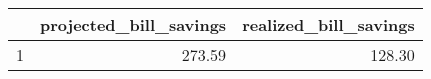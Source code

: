 \begin{table}[ht]
\centering
\begin{tabular}{rrr}
  \hline
 & projected\_bill\_savings & realized\_bill\_savings \\ 
  \hline
1 & 273.59 & 128.30 \\ 
   \hline
\end{tabular}
\end{table}
